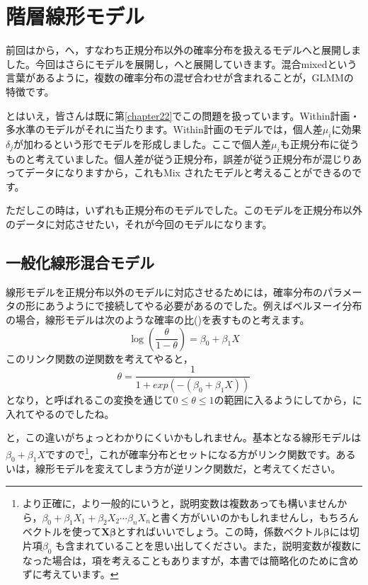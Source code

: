\documentclass{ltjsbook}
\begin{document}
 
\VerbatimFootnotes
\chapter{階層線形モデル}
\label{chapter25} 
前回はから，へ，すなわち正規分布以外の確率分布を扱えるモデルへと展開しました。今回はさらにモデルを展開し，へと展開していきます。混合mixedという言葉があるように，複数の確率分布の混ぜ合わせが含まれることが，GLMMの特徴です。

とはいえ，皆さんは既に第\ref{chapter22}でこの問題を扱っています。Within計画・多水準のモデルがそれに当たります。Within計画のモデルでは，個人差$\mu_i$に効果$\delta_j$が加わるという形でモデルを形成しました。ここで個人差$\mu_i$も正規分布に従うものと考えていました。個人差が従う正規分布，誤差が従う正規分布が混じりあってデータになりますから，これもMix されたモデルと考えることができるのです。

ただしこの時は，いずれも正規分布のモデルでした。このモデルを正規分布以外のデータに対応させたい，それが今回のモデルになります。
\section{一般化線形混合モデル}
線形モデルを正規分布以外のモデルに対応させるためには，確率分布のパラメータの形にあうようにで接続してやる必要があるのでした。例えばベルヌーイ分布の場合，線形モデルは次のような確率の比()を表すものと考えます。
\[ \log\left(\frac{\theta}{1-\theta}\right) =  \beta_0 + \beta_1 X \]
このリンク関数の逆関数を考えてやると，
\[ \theta = \frac{1}{1+exp(-(\beta_0+\beta_1 X))} \]
となり，と呼ばれるこの変換を通じて$0 \le \theta \le 1$の範囲に入るようにしてから，に入れてやるのでしたね。

と，この違いがちょっとわかりにくいかもしれません。基本となる線形モデルは$\beta_0 + \beta_1 X$ですので\footnote{より正確に，より一般的にいうと，説明変数は複数あっても構いませんから，$\beta_0 + \beta_1 X_1 + \beta_2 X_2 \cdots \beta_n X_n$と書く方がいいのかもしれませんし，もちろんベクトルを使って$\bm{X\beta}$とすればいいでしょう。この時，係数ベクトル$\bm{\beta}$には切片項$\beta_0$ も含まれていることを思い出してください。また，説明変数が複数になった場合は，項を考えることもありますが，本書では簡略化のために含めずに考えています。}，これが確率分布とセットになる方がリンク関数です。あるいは，線形モデルを変えてしまう方が逆リンク関数だ，と考えてください。
\end{document}
